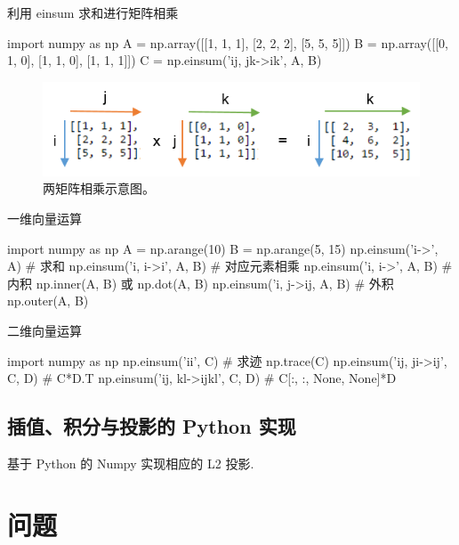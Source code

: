 \documentclass{article}
\begin{document}
\begin{listing}[H]
    \caption{利用 einsum 求和进行矩阵相乘}
    \begin{pythoncode}
        import numpy as np
        A = np.array([[1, 1, 1], [2, 2, 2], [5, 5, 5]])
        B = np.array([[0, 1, 0], [1, 1, 0], [1, 1, 1]])
        C = np.einsum('ij, jk->ik', A, B)
    \end{pythoncode}
\end{listing}

\begin{figure}[ht!]
    \centering
    \includegraphics[scale=2]{./figures/twomat.png}
    \caption{两矩阵相乘示意图。}
    \label{fig:twomat}
\end{figure}

\begin{listing}[H]
    \caption{一维向量运算}
    \begin{pythoncode}
        import numpy as np
        A = np.arange(10)
        B = np.arange(5, 15)
        np.einsum('i->', A) # 求和
        np.einsum('i, i->i', A, B) # 对应元素相乘 
        np.einsum('i, i->', A, B) # 内积 np.inner(A, B) 或 np.dot(A, B)
        np.einsum('i, j->ij, A, B) # 外积 np.outer(A, B)
    \end{pythoncode}
\end{listing}

\begin{listing}[H]
    \caption{二维向量运算}
    \begin{pythoncode}
        import numpy as np
        np.einsum('ii', C) # 求迹 np.trace(C)
        np.einsum('ij, ji->ij', C, D) #  C*D.T 
        np.einsum('ij, kl->ijkl', C, D) # C[:, :, None, None]*D 
    \end{pythoncode}
\end{listing}

\subsection{插值、积分与投影的 Python 实现}
基于 Python 的 Numpy 实现相应的 L2 投影.

\section{问题}

\cite{fem_2010}


\end{document}
